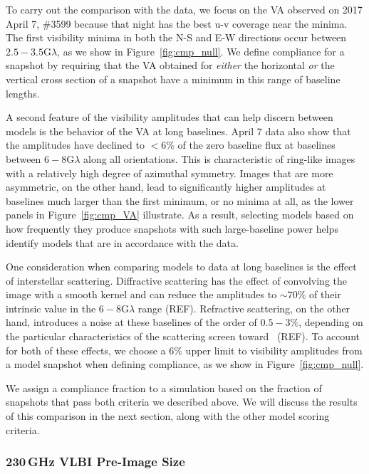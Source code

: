 To carry out the comparison with the data, we focus on the VA observed
on 2017 April 7, \#3599 because that night has the best u-v coverage
near the minima.
The first visibility minima in both the N-S and E-W directions occur
between $2.5-3.5$\;G$\lambda$, as we show in
Figure~\ref{fig:cmp_null}.
We define compliance for a snapshot by requiring that the VA obtained
for {\it either} the horizontal {\it or} the vertical cross section of
a snapshot have a minimum in this range of baseline lengths.

A second feature of the visibility amplitudes that can help discern
between models is the behavior of the VA at long baselines.
April 7 data also show that the amplitudes have declined to $<6\%$ of
the zero baseline flux at baselines between $6-8$\;G$\lambda$ along
all orientations.
This is characteristic of ring-like images with a relatively high
degree of azimuthal symmetry.
Images that are more asymmetric, on the other hand, lead to
significantly higher amplitudes at baselines much larger than the
first minimum, or no minima at all, as the lower panels in
Figure~\ref{fig:cmp_VA} illustrate.
As a result, selecting models based on how frequently they produce
snapshots with such large-baseline power helps identify models that
are in accordance with the data.

One consideration when comparing models to data at long baselines is
the effect of interstellar scattering.
Diffractive scattering has the effect of convolving the image with a
smooth kernel and can reduce the amplitudes to $\sim 70\%$ of their
intrinsic value in the $6-8$\;G$\lambda$ range (REF).
Refractive scattering, on the other hand, introduces a noise at these
baselines of the order of $0.5-3\%$, depending on the particular
characteristics of the scattering screen toward \sgra\ (REF).
To account for both of these effects, we choose a $6\%$ upper limit to
visibility amplitudes from a model snapshot when defining compliance,
as we show in Figure~\ref{fig:cmp_null}.

We assign a compliance fraction to a simulation based on the fraction
of snapshots that pass both criteria we described above.
We will discuss the results of this comparison in the next section,
along with the other model scoring criteria.

\subsubsection{230\,GHz VLBI Pre-Image Size}

